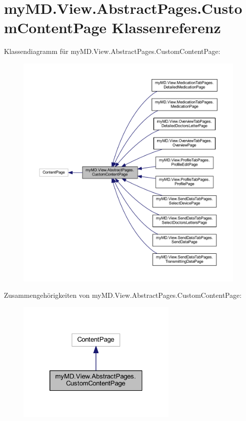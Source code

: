 \hypertarget{classmy_m_d_1_1_view_1_1_abstract_pages_1_1_custom_content_page}{}\section{my\+M\+D.\+View.\+Abstract\+Pages.\+Custom\+Content\+Page Klassenreferenz}
\label{classmy_m_d_1_1_view_1_1_abstract_pages_1_1_custom_content_page}


Klassendiagramm für my\+M\+D.\+View.\+Abstract\+Pages.\+Custom\+Content\+Page\+:\nopagebreak
\begin{figure}[H]
\begin{center}
\leavevmode
\includegraphics[width=350pt]{classmy_m_d_1_1_view_1_1_abstract_pages_1_1_custom_content_page__inherit__graph}
\end{center}
\end{figure}


Zusammengehörigkeiten von my\+M\+D.\+View.\+Abstract\+Pages.\+Custom\+Content\+Page\+:\nopagebreak
\begin{figure}[H]
\begin{center}
\leavevmode
\includegraphics[width=220pt]{classmy_m_d_1_1_view_1_1_abstract_pages_1_1_custom_content_page__coll__graph}
\end{center}
\end{figure}
